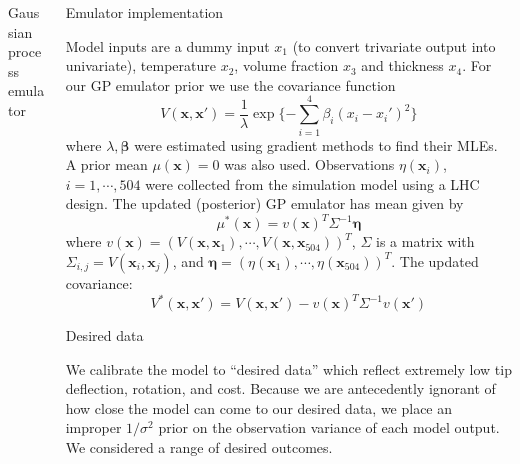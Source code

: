 \documentclass[final]{beamer}
\newlength{\onecolwid}
\newlength{\twocolwid}
\begin{document}
\begin{frame}[t]
\begin{columns}[t]
\begin{column}{\twocolwid}
\begin{columns}[t,totalwidth=\twocolwid]
\begin{column}{\onecolwid}
\begin{alertblock}{Gaussian process emulator}
\end{alertblock}



\end{column} %

\begin{column}{\onecolwid}\vspace{-.6in} %


\begin{alertblock}{Emulator implementation}

Model inputs are a dummy input $x_1$ (to convert trivariate output into univariate), temperature $x_2$, volume fraction $x_3$ and thickness $x_4$. For our GP emulator prior we use the covariance function
\[
V(\mathbf x,\mathbf x' ) = \frac1\lambda \exp\{-\sum_{i=1}^4 \beta_i(x_i-x_i')^2 \}
\]
where $\lambda,\boldsymbol \beta$ were estimated using gradient methods to find their MLEs. 
A prior mean $\mu(\mathbf x) = 0$ was also used. Observations $\eta(\mathbf x_i)$, $i=1,\cdots,504$ were collected from the simulation model using a LHC design. %
The updated (posterior) GP emulator has mean given by
\[\mu^*(\mathbf x) = v(\mathbf x)^T \Sigma^{-1} \boldsymbol \eta \]
where $v(\mathbf x) = (V(\mathbf x, \mathbf x_1),\cdots,V(\mathbf x,\mathbf x_{504}))^T$, $\Sigma$ is a matrix with $\Sigma_{i,j} = V(\mathbf x_i,\mathbf x_j)$, and $\boldsymbol \eta = (\eta(\mathbf x_1),\cdots,\eta(\mathbf x_{504}))^T$. The updated covariance:
\[
V^* (\mathbf x, \mathbf x') = V(\mathbf x, \mathbf x') - v(\mathbf x)^T \Sigma^{-1} v(\mathbf x')
\]
\end{alertblock}


\begin{alertblock}{Desired data}

We calibrate the model to ``desired data'' which reflect extremely low tip deflection, rotation, and cost. Because we are antecedently ignorant of how close the model can come to our desired data, we place an improper $1/\sigma^2$ prior on the observation variance of each model output. We considered a range of desired outcomes.


\end{alertblock}
\end{column}
\end{columns}
\end{column}
\end{columns}
\end{frame}
\end{document}
